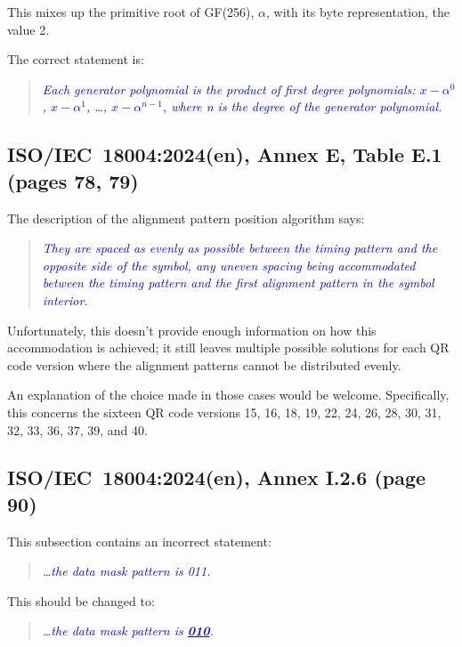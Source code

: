 \documentclass[a4paper,twoside]{article}
\newcommand{\shortstandard}{ISO/IEC~18004}
\newcommand{\standard}{\shortstandard:2024(en)}
\newcommand{\quotestandard}[1]{\textcolor{blue}{\textit{#1}}}
\newcommand{\ddd}{\dots}
\newcommand{\change}[1]{\underline{\textbf{#1}}}
\begin{document}
This mixes up the primitive root of GF(256), $\alpha$, with its byte representation, the value 2.

The correct statement is:

\begin{quote}
\quotestandard{Each generator polynomial is the product of first degree polynomials: \change{$x - \alpha^0$}, \change{$x - \alpha^1$}, \dots, \change{$x - \alpha^{n-1}$},
where n is the degree of the generator polynomial.}
\end{quote}

\subsection{\standard, Annex E, Table E.1 (pages 78, 79)}

The description of the alignment pattern position algorithm says:

\begin{quote}
\quotestandard{They are spaced as evenly as possible between the timing pattern and the opposite side of the symbol, any uneven
spacing being accommodated between the timing pattern and the first alignment pattern in the symbol interior.}
\end{quote}

Unfortunately, this doesn't provide enough information on how this accommodation is achieved; it still leaves multiple
possible solutions for each QR code version where the alignment patterns cannot be distributed evenly.

An explanation  of the choice made in those cases would be welcome. Specifically, this concerns the sixteen QR code versions
15, 16, 18, 19, 22, 24, 26, 28, 30, 31, 32, 33, 36, 37, 39, and 40.

\subsection{\standard, Annex I.2.6 (page 90)}
\label{sec:dmp-changed-2}

This subsection contains an incorrect statement:

\begin{quote}
\quotestandard{\ddd the data mask pattern is 011.}
\end{quote}

This should be changed to:

\begin{quote}
\quotestandard{\ddd the data mask pattern is \change{010}.}
\end{quote}
\end{document}
